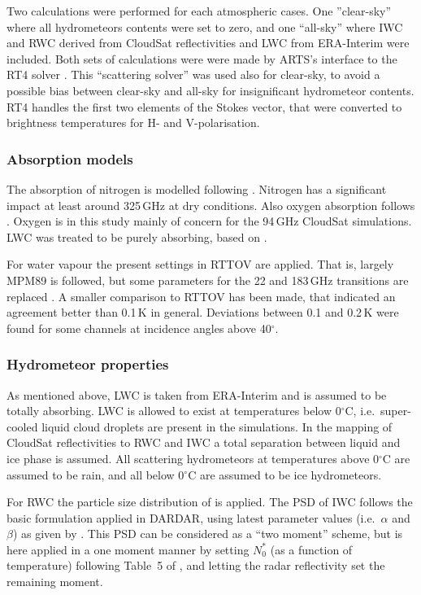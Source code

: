 \documentclass[12pt]{article}
\begin{document}
Two calculations were performed for each atmospheric cases. One ''clear-sky''
where all hydrometeors contents were set to zero, and one ``all-sky'' where IWC
and RWC derived from CloudSat reflectivities and LWC from ERA-Interim were
included. Both sets of calculations were were made by ARTS's interface to the
RT4 solver \citep{evans1995microwavec}. This ``scattering solver'' was used
also for clear-sky, to avoid a possible bias between clear-sky and all-sky for
insignificant hydrometeor contents. RT4 handles the first two elements of the
Stokes vector, that were converted to brightness temperatures for H- and
V-polarisation.


\subsubsection{Absorption models}
%
The absorption of nitrogen is modelled following \citet{pwr:93}. Nitrogen has a
significant impact at least around 325\,GHz at dry conditions. Also oxygen
absorption follows \citet{pwr:93}. Oxygen is in this study mainly of concern
for the 94\,GHz CloudSat simulations. LWC was treated to be
purely absorbing, based on \citet{ellison2007permittivity}.

For water vapour the present settings in RTTOV are applied. That is, largely
MPM89 \citep{liebe:89} is followed, but some parameters for the 22 and 183\,GHz
transitions are replaced \citep{saunders2018update,turner2019amsutran}. A
smaller comparison to RTTOV has been made, that indicated an agreement better
than 0.1\,K in general. Deviations between 0.1 and 0.2\,K were found for some
channels at incidence angles above 40$^\circ$.


\subsubsection{Hydrometeor properties}
%
As mentioned above, LWC is taken from ERA-Interim and is assumed to be totally
absorbing. LWC is allowed to exist at temperatures below 0$^\circ$C, i.e.\
super-cooled liquid cloud droplets are present in the simulations. In the
mapping of CloudSat reflectivities to RWC and IWC a total separation between
liquid and ice phase is assumed. All scattering hydrometeors at temperatures
above 0$^\circ$C are assumed to be rain, and all below 0$^\circ$C are assumed
to be ice hydrometeors.

For RWC the particle size distribution of \citet{abel2012improved} is applied.
The PSD of IWC follows the basic formulation applied in DARDAR, using latest
parameter values (i.e.\ $\alpha$ and $\beta$) as given by
\citet{amt-12-2819-2019}. This PSD can be considered as a ``two moment''
scheme, but is here applied in a one moment manner by setting $N_0^*$ (as a
function of temperature) following Table~5 of \citet{delanoe2014normalized},
and letting the radar reflectivity set the remaining moment.
\end{document}
